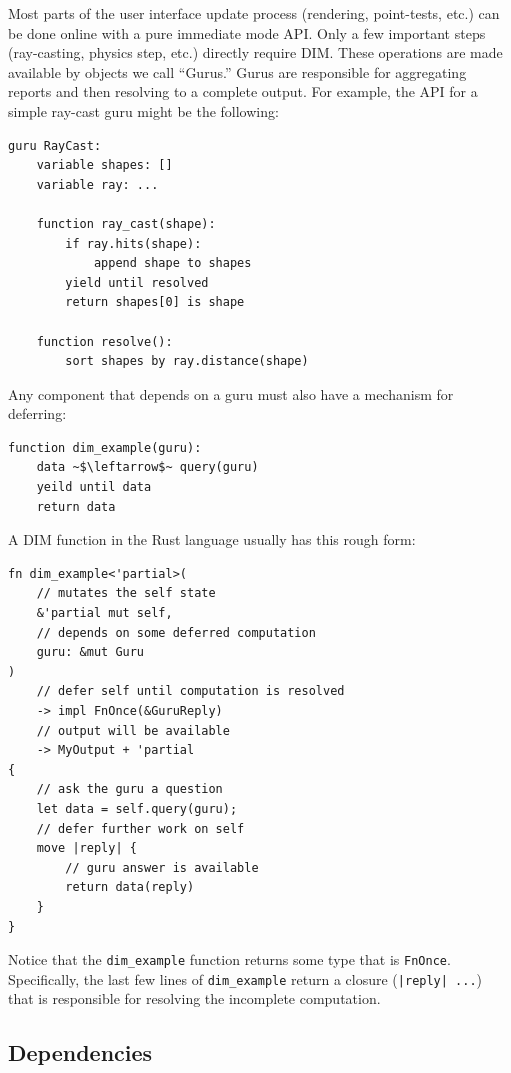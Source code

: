 \documentclass[conference,12pt]{IEEEtran}
\begin{document}
Most parts of the user interface update process (rendering, point-tests, etc.)
can be done online with a pure immediate mode API. Only a few important steps
(ray-casting, physics step, etc.) directly require DIM. These operations are
made available by objects we call ``Gurus.'' Gurus are responsible for
aggregating reports and then resolving to a complete output. For example, the
API for a simple ray-cast guru might be the following:

\begin{verbatim}
guru RayCast:
    variable shapes: []
    variable ray: ...

    function ray_cast(shape):
        if ray.hits(shape):
            append shape to shapes
        yield until resolved
        return shapes[0] is shape

    function resolve():
        sort shapes by ray.distance(shape)
\end{verbatim}

Any component that depends on a guru must also have a mechanism for deferring:

\begin{verbatim}
function dim_example(guru):
    data ~$\leftarrow$~ query(guru)
    yeild until data
    return data
\end{verbatim}

\newpage
A DIM function in the Rust language usually has this rough form:

\begin{verbatim}
fn dim_example<'partial>(
    // mutates the self state
    &'partial mut self,
    // depends on some deferred computation
    guru: &mut Guru
)
    // defer self until computation is resolved
    -> impl FnOnce(&GuruReply)
    // output will be available
    -> MyOutput + 'partial
{
    // ask the guru a question
    let data = self.query(guru);
    // defer further work on self
    move |reply| {
        // guru answer is available
        return data(reply)
    }
}
\end{verbatim}

Notice that the \texttt{dim\_example} function returns some type that is
\texttt{FnOnce}. Specifically, the last few lines of \texttt{dim\_example}
return a closure (\texttt{|reply| ...}) that is responsible for
resolving the incomplete computation.

\subsection{Dependencies}
\end{document}

